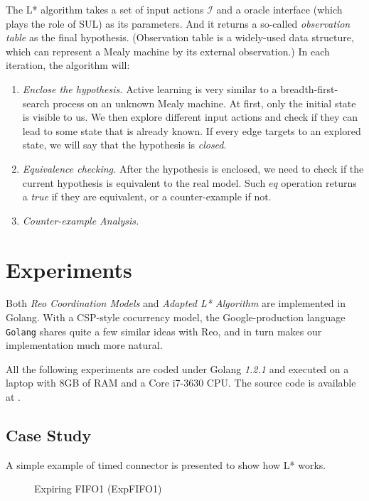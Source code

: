 \documentclass[conference, a4paper]{IEEEtran}
\begin{document}
The L* algorithm takes a set of input actions $\mathcal{I}$ and a oracle interface (which plays the
role of SUL) as its parameters. And it returns a so-called \emph{observation table} as the final
hypothesis. (Observation table is a widely-used data structure, which can represent a Mealy machine
by its external observation.)
In each iteration, the algorithm will:
\begin{enumerate}
  \item \emph{Enclose the hypothesis.} Active learning is very similar to a breadth-first-search
    process on an unknown Mealy machine. At first, only the initial state is visible to us. We then
    explore different input actions and check if they can lead to some state that is already known.
    If every edge targets to an explored state, we will say that the hypothesis is \emph{closed}.
  \item \emph{Equivalence checking.} After the hypothesis is enclosed, we need to check if the
    current hypothesis is equivalent to the real model. Such $eq$ operation returns a
    \emph{true} if they are equivalent, or a counter-example if not.
  \item \emph{Counter-example Analysis.}  
\end{enumerate}


\section{Experiments}  
\label{sec:experiment}

Both \emph{Reo Coordination Models} and \emph{Adapted L* Algorithm} are implemented in
Golang. With a CSP-style\cite{DBLP:books/ph/Hoare85} cocurrency model, the Google-production language
\texttt{Golang} shares quite a few similar ideas with Reo, and in turn makes our implementation much
more natural.

All the following experiments are coded under Golang \emph{1.2.1} and executed on a laptop with 8GB
of RAM and a Core i7-3630 CPU. The source code is available at \cite{reo-learn-github}.

\subsection{Case Study}
A simple example of timed connector is presented to show how L* works.
\begin{figure}[ht]
  \begin{center}
    
  \end{center}
  \caption{Expiring FIFO1 (ExpFIFO1)}
  \label{fig:expfifo}
\end{figure}
\end{document}
